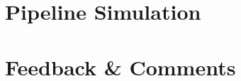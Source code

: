 \documentclass[12pt,a4paper,titlepage,oneside]{article}
\begin{document}
\maketitle

\section*{Pipeline Simulation}

\clearpage
\section*{Feedback \& Comments}

 
\end{document}
